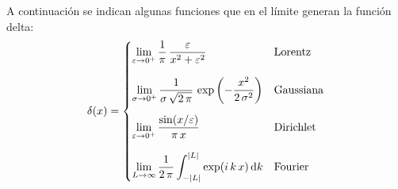 A continuación se indican algunas funciones que en el límite generan la función delta:
\begin{align*}
\delta(x) = \begin{cases}
\displaystyle
\lim_{\varepsilon \to 0^{+}} \dfrac{1}{\pi} \, \dfrac{\varepsilon}{x^{2} + \varepsilon^{2}} & \mbox{Lorentz} \\[1.5em]
\displaystyle
\lim_{\sigma \to 0^{+}} \dfrac{1}{\sigma \, \sqrt{2 \, \pi}} \, \exp \left( - \dfrac{x^{2}}{2 \, \sigma^{2}} \right) & \mbox{Gaussiana} \\[1.5em]
\displaystyle \lim_{\varepsilon \to 0^{+}} \dfrac{\sin(x / \varepsilon)}{ \pi \, x} & \mbox{Dirichlet} \\[1.5em]
\displaystyle \lim_{L \to \infty} \dfrac{1}{2 \, \pi} \int_{- \abs{L}}^{\abs{L}} \exp(i \, k \, x) \dd{k} & \mbox{Fourier}
\end{cases}
\end{align*}

